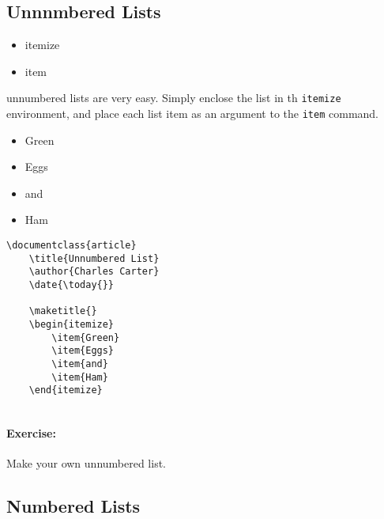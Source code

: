         \subsection{Unnnmbered Lists}
        \label{Unnnumbered Lists}
        
        \begin{framed}
            \begin{itemize}
                \item{itemize}
                \item{item}
            \end{itemize}
        \end{framed}

        \Lx{} unnumbered lists are very easy. Simply enclose the list in th \texttt{itemize} environment, and place each list item as an argument to the \texttt{item} command.

    \begin{itemize}
        \item{Green}
        \item{Eggs}
        \item{and}
        \item{Ham}
    \end{itemize}

        \begin{verbatim}
\documentclass{article}
    \title{Unnumbered List}
    \author{Charles Carter}
    \date{\today{}}
 
    \maketitle{}
    \begin{itemize}
        \item{Green}
        \item{Eggs}
        \item{and}
        \item{Ham}
    \end{itemize}
    
        \end{verbatim}

        \paragraph{Exercise:} Make your own unnumbered list.

        \subsection{Numbered Lists}
        \label{Numbered Lists}
        

